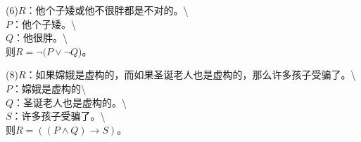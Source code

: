 \documentclass[
]{article}
\begin{document}
(6)\(R\)：他个子矮或他不很胖都是不对的。\textbackslash{}\\
\(P\)：他个子矮。\textbackslash{}\\
\(Q\)：他很胖。\textbackslash{}\\
则\(R=\neg(P \vee \neg Q\))。

(8)\(R\)：如果嫦娥是虚构的，而如果圣诞老人也是虚构的，那么许多孩子受骗了。\textbackslash{}\\
\(P\)：嫦娥是虚构的\textbackslash{}\\
\(Q\)：圣诞老人也是虚构的。\textbackslash{}\\
\(S\)：许多孩子受骗了。\textbackslash{}\\
则\(R=((P\wedge Q)\rightarrow S)\)。
\end{document}
